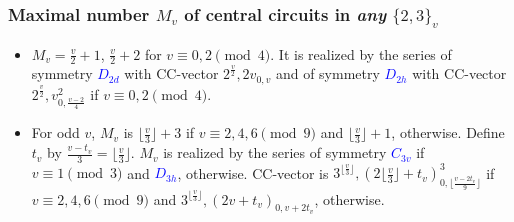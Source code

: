 \documentclass{beamer}
\begin{document}
\begin{frame}\frametitle{Maximal number $M_v$ of central circuits in {\em any}  
$\{2,3\}_v$} 
\begin{itemize}
\item $M_v=\frac{v}{2}+1$, $\frac{v}{2}+2$ for $v\equiv 0, 2\pmod 4$.
It is realized by the series of symmetry
\textcolor{blue}{$D_{2d}$} with CC-vector $2^{\frac{v}{2}}, 2v_{0,v}$ 
and of symmetry \textcolor{blue}{$D_{2h}$} with CC-vector $2^{\frac{v}{2}}, 
v^2_{0,\frac{v-2}{4}}$ if $v\equiv
0,2\pmod 4$.
\item For odd $v$, $M_v$ is $\lfloor \frac{v}{3}\rfloor+3$ if $v\equiv 2,4,6\pmod 9$
and $\lfloor \frac{v}{3}\rfloor + 1$, otherwise. Define $t_v$ by 
$\frac{v-t_v}{3}=\lfloor\frac{v}{3}\rfloor$. $M_v$ is realized by the series of  
symmetry \textcolor{blue}{$C_{3v}$} if $v\equiv 1\pmod 3$ and  
\textcolor{blue}{$D_{3h}$}, otherwise.
CC-vector is $3^{\lfloor \frac{v}{3}\rfloor}, (2\lfloor \frac{v}{3}\rfloor 
+t_v)^3_{0,\lfloor \frac{v-2t_v}{9}\rfloor}$ if $v\equiv 2,4,6 \pmod 9$ and $3^{\lfloor 
\frac{v}{3}\rfloor}, (2v+t_v)_{0,v+2t_v}$, otherwise.
\end{itemize}

\end{frame}
\end{document}
